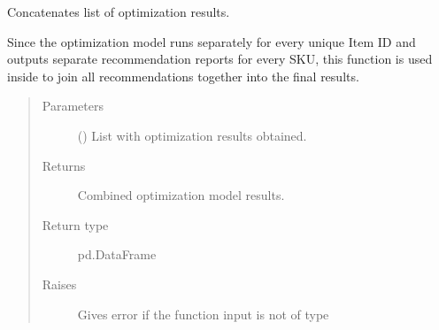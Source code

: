 \documentclass[letterpaper,10pt,english]{sphinxmanual}
\begin{document}
\begin{fulllineitems}
\label{\detokenize{source/optimization.model:optimization.model.main.concat}}
Concatenates list of optimization results.

Since the optimization model runs separately for every unique Item ID
and outputs separate recommendation reports for every SKU, this function is used inside
 to join all recommendations together into the final results.
\begin{quote}\begin{description}
\item[{Parameters}] \leavevmode
{} (\sphinxstyleliteralemphasis{\sphinxupquote{(}}\sphinxstyleliteralemphasis{\sphinxupquote{)}}) \textendash{} List with optimization results obtained.

\item[{Returns}] \leavevmode
Combined optimization model results.

\item[{Return type}] \leavevmode
pd.DataFrame

\item[{Raises}] \leavevmode
{} \textendash{} Gives error if the function input  is not of type 

\end{description}\end{quote}

\end{fulllineitems}

\end{document}
